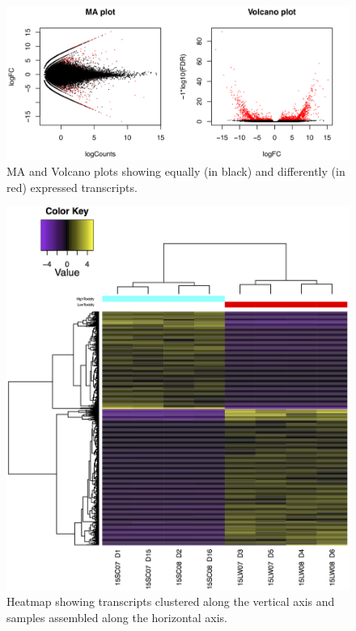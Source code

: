 \begin{figure}
    \centering
    \includegraphics[width=\textwidth]{figs/plots.png}
    \caption{MA and Volcano plots showing equally (in black) and differently (in red) expressed transcripts.}
    \label{fig:plots}
\end{figure}

\begin{figure}
    \centering
    \includegraphics[width=\textwidth]{figs/heatmap.png}
    \caption{Heatmap showing transcripts clustered along the vertical axis and samples assembled along the horizontal axis.}
    \label{fig:heat}
\end{figure}

